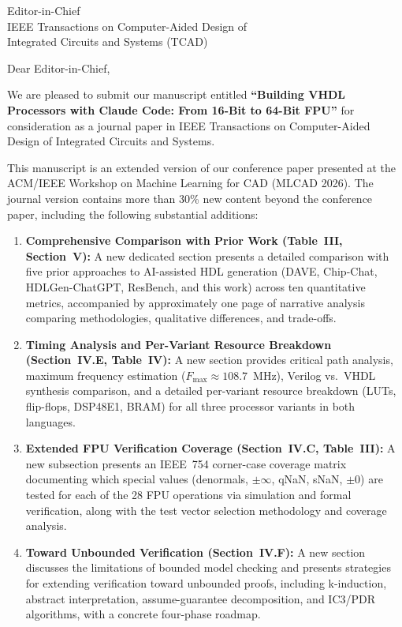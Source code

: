 \documentclass[11pt]{letter}
\date{March 24, 2026}
\begin{document}
\begin{letter}{%
Editor-in-Chief\\
IEEE Transactions on Computer-Aided Design of\\
Integrated Circuits and Systems (TCAD)}

\opening{Dear Editor-in-Chief,}

We are pleased to submit our manuscript entitled \textbf{``Building VHDL
Processors with Claude Code: From 16-Bit to 64-Bit FPU''} for
consideration as a journal paper in IEEE Transactions on Computer-Aided
Design of Integrated Circuits and Systems.

This manuscript is an extended version of our conference paper presented
at the ACM/IEEE Workshop on Machine Learning for CAD (MLCAD 2026).  The
journal version contains more than 30\% new content beyond the
conference paper, including the following substantial additions:

\begin{enumerate}
\item \textbf{Comprehensive Comparison with Prior Work
      (Table~III, Section~V):} A new dedicated section presents a
      detailed comparison with five prior approaches to AI-assisted HDL
      generation (DAVE, Chip-Chat, HDLGen-ChatGPT, ResBench, and this
      work) across ten quantitative metrics, accompanied by
      approximately one page of narrative analysis comparing
      methodologies, qualitative differences, and trade-offs.

\item \textbf{Timing Analysis and Per-Variant Resource Breakdown
      (Section~IV.E, Table~IV):} A new section provides critical path
      analysis, maximum frequency estimation ($F_{\max} \approx
      108.7$~MHz), Verilog vs.\ VHDL synthesis comparison, and a
      detailed per-variant resource breakdown (LUTs, flip-flops, DSP48E1,
      BRAM) for all three processor variants in both languages.

\item \textbf{Extended FPU Verification Coverage
      (Section~IV.C, Table~III):} A new subsection presents an IEEE~754
      corner-case coverage matrix documenting which special values
      (denormals, $\pm\infty$, qNaN, sNaN, $\pm 0$) are tested for
      each of the 28 FPU operations via simulation and formal
      verification, along with the test vector selection methodology
      and coverage analysis.

\item \textbf{Toward Unbounded Verification (Section~IV.F):} A new
      section discusses the limitations of bounded model checking and
      presents strategies for extending verification toward unbounded
      proofs, including k-induction, abstract interpretation,
      assume-guarantee decomposition, and IC3/PDR algorithms, with a
      concrete four-phase roadmap.


\end{enumerate}
\end{letter}
\end{document}
